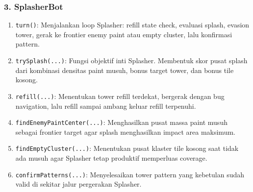 \subsubsection{3. SplasherBot}
\begin{enumerate}
	\item \texttt{turn()}:
	      Menjalankan loop Splasher: refill state check, evaluasi splash, evasion tower, gerak ke frontier enemy paint atau empty cluster, lalu konfirmasi pattern.

	\item \texttt{trySplash(...)}:
	      Fungsi objektif inti Splasher. Membentuk skor pusat splash dari kombinasi densitas paint musuh, bonus target tower, dan bonus tile kosong.

	\item \texttt{refill(...)}:
	      Menentukan tower refill terdekat, bergerak dengan bug navigation, lalu refill sampai ambang keluar refill terpenuhi.

	\item \texttt{findEnemyPaintCenter(...)}:
	      Menghasilkan pusat massa paint musuh sebagai frontier target agar splash menghasilkan impact area maksimum.

	\item \texttt{findEmptyCluster(...)}:
	      Menentukan pusat klaster tile kosong saat tidak ada musuh agar Splasher tetap produktif memperluas coverage.

	\item \texttt{confirmPatterns(...)}:
	      Menyelesaikan tower pattern yang kebetulan sudah valid di sekitar jalur pergerakan Splasher.
\end{enumerate}

